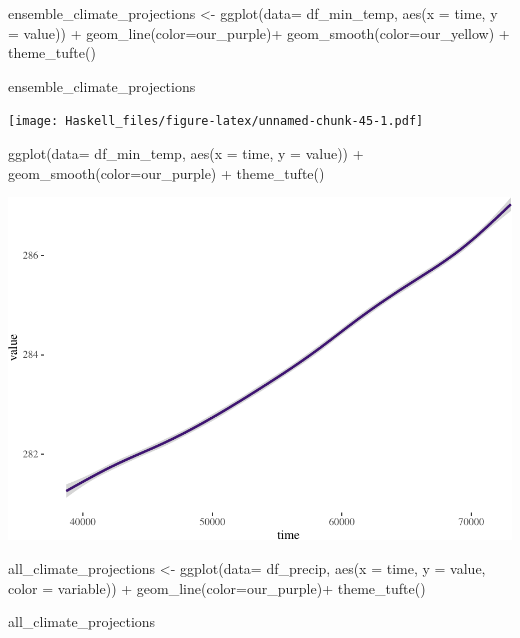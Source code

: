 \documentclass[
  paper=a4,
  ,captions=tableheading
]{scrartcl}
\newenvironment{Shaded}{\begin{snugshade}}{\end{snugshade}}
\newcommand{\AttributeTok}[1]{\textcolor[rgb]{0.77,0.63,0.00}{#1}}
\newcommand{\FunctionTok}[1]{\textcolor[rgb]{0.00,0.00,0.00}{#1}}
\newcommand{\NormalTok}[1]{#1}
\newcommand{\OtherTok}[1]{\textcolor[rgb]{0.56,0.35,0.01}{#1}}
\newcommand{\SpecialCharTok}[1]{\textcolor[rgb]{0.00,0.00,0.00}{#1}}
\begin{document}
\begin{Shaded}
\begin{Highlighting}[]
\NormalTok{ensemble\_climate\_projections }\OtherTok{\textless{}{-}} \FunctionTok{ggplot}\NormalTok{(}\AttributeTok{data=}\NormalTok{ df\_min\_temp, }\FunctionTok{aes}\NormalTok{(}\AttributeTok{x =}\NormalTok{ time, }\AttributeTok{y =}\NormalTok{ value)) }\SpecialCharTok{+} 
  \FunctionTok{geom\_line}\NormalTok{(}\AttributeTok{color=}\NormalTok{our\_purple)}\SpecialCharTok{+}
  \FunctionTok{geom\_smooth}\NormalTok{(}\AttributeTok{color=}\NormalTok{our\_yellow) }\SpecialCharTok{+}
  \FunctionTok{theme\_tufte}\NormalTok{()}
  

\NormalTok{ensemble\_climate\_projections}
\end{Highlighting}
\end{Shaded}

\texttt{[image: Haskell\_files/figure-latex/unnamed-chunk-45-1.pdf]}

\begin{Shaded}
\begin{Highlighting}[]
\FunctionTok{ggplot}\NormalTok{(}\AttributeTok{data=}\NormalTok{ df\_min\_temp, }\FunctionTok{aes}\NormalTok{(}\AttributeTok{x =}\NormalTok{ time, }\AttributeTok{y =}\NormalTok{ value)) }\SpecialCharTok{+} 
  \FunctionTok{geom\_smooth}\NormalTok{(}\AttributeTok{color=}\NormalTok{our\_purple) }\SpecialCharTok{+}
  \FunctionTok{theme\_tufte}\NormalTok{()}
\end{Highlighting}
\end{Shaded}

\includegraphics{Haskell_files/figure-latex/unnamed-chunk-45-2.pdf}

\begin{Shaded}
\begin{Highlighting}[]
\NormalTok{all\_climate\_projections }\OtherTok{\textless{}{-}} \FunctionTok{ggplot}\NormalTok{(}\AttributeTok{data=}\NormalTok{ df\_precip, }\FunctionTok{aes}\NormalTok{(}\AttributeTok{x =}\NormalTok{ time, }\AttributeTok{y =}\NormalTok{ value, }\AttributeTok{color =}\NormalTok{ variable)) }\SpecialCharTok{+} 
  \FunctionTok{geom\_line}\NormalTok{(}\AttributeTok{color=}\NormalTok{our\_purple)}\SpecialCharTok{+}
  \FunctionTok{theme\_tufte}\NormalTok{()}
  

\NormalTok{all\_climate\_projections}
\end{Highlighting}
\end{Shaded}
\end{document}
